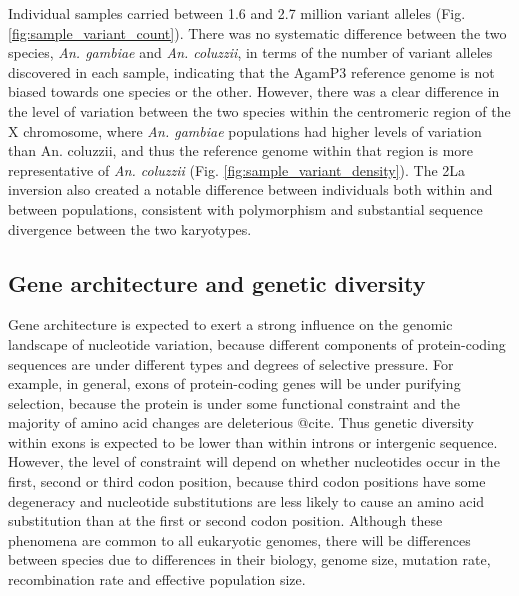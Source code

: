 \documentclass[a4paper,11pt,abstracton,hidelinks]{scrartcl}
\begin{document}
Individual samples carried between 1.6 and 2.7 million variant alleles (Fig. \ref{fig:sample_variant_count}).
%
There was no systematic difference between the two species, \textit{An. gambiae} and \textit{An. coluzzii}, in terms of the number of variant alleles discovered in each sample, indicating that the AgamP3 reference genome is not biased towards one species or the other.
%
However, there was a clear difference in the level of variation between the two species within the centromeric region of the X chromosome, where \textit{An. gambiae} populations had higher levels of variation than An. coluzzii, and thus the reference genome within that region is more representative of \textit{An. coluzzii} (Fig. \ref{fig:sample_variant_density}).
%
The 2La inversion also created a notable difference between individuals both within and between populations, consistent with polymorphism and substantial sequence divergence between the two karyotypes.


\subsection{Gene architecture and genetic diversity}


%
Gene architecture is expected to exert a strong influence on the genomic landscape of nucleotide variation, because different components of protein-coding sequences are under different types and degrees of selective pressure.
%
For example, in general, exons of protein-coding genes will be under purifying selection, because the protein is under some functional constraint and the majority of amino acid changes are deleterious @cite.
%
Thus genetic diversity within exons is expected to be lower than within introns or intergenic sequence.
%
However, the level of constraint will depend on whether nucleotides occur in the first, second or third codon position, because third codon positions have some degeneracy and nucleotide substitutions are less likely to cause an amino acid substitution than at the first or second codon position.
%
Although these phenomena are common to all eukaryotic genomes, there will be differences between species due to differences in their biology, genome size, mutation rate, recombination rate and effective population size.
%
\end{document}
